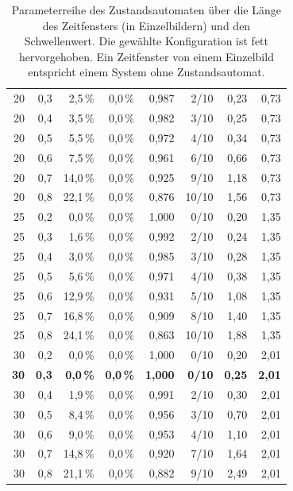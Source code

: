 \begin{table}[H]
\begin{tabular}{rrrrrrrr}
        20 & 0,3 & 2,5\,\% & 0,0\,\% & 0,987 & 2/10 & 0,23 & 0,73 \\
        20 & 0,4 & 3,5\,\% & 0,0\,\% & 0,982 & 3/10 & 0,25 & 0,73 \\
        20 & 0,5 & 5,5\,\% & 0,0\,\% & 0,972 & 4/10 & 0,34 & 0,73 \\
        20 & 0,6 & 7,5\,\% & 0,0\,\% & 0,961 & 6/10 & 0,66 & 0,73 \\
        20 & 0,7 & 14,0\,\% & 0,0\,\% & 0,925 & 9/10 & 1,18 & 0,73 \\
        20 & 0,8 & 22,1\,\% & 0,0\,\% & 0,876 & 10/10 & 1,56 & 0,73 \\
        \midrule
        25 & 0,2 & 0,0\,\% & 0,0\,\% & 1,000 & 0/10 & 0,20 & 1,35 \\
        25 & 0,3 & 1,6\,\% & 0,0\,\% & 0,992 & 2/10 & 0,24 & 1,35 \\
        25 & 0,4 & 3,0\,\% & 0,0\,\% & 0,985 & 3/10 & 0,28 & 1,35 \\
        25 & 0,5 & 5,6\,\% & 0,0\,\% & 0,971 & 4/10 & 0,38 & 1,35 \\
        25 & 0,6 & 12,9\,\% & 0,0\,\% & 0,931 & 5/10 & 1,08 & 1,35 \\
        25 & 0,7 & 16,8\,\% & 0,0\,\% & 0,909 & 8/10 & 1,40 & 1,35 \\
        25 & 0,8 & 24,1\,\% & 0,0\,\% & 0,863 & 10/10 & 1,88 & 1,35 \\
        \midrule
        30 & 0,2 & 0,0\,\% & 0,0\,\% & 1,000 & 0/10 & 0,20 & 2,01 \\
        \textbf{30} & \textbf{0,3} & \textbf{0,0\,\%} & \textbf{0,0\,\%} & \textbf{1,000} & \textbf{0/10} & \textbf{0,25} & \textbf{2,01} \\
        30 & 0,4 & 1,9\,\% & 0,0\,\% & 0,991 & 2/10 & 0,30 & 2,01 \\
        30 & 0,5 & 8,4\,\% & 0,0\,\% & 0,956 & 3/10 & 0,70 & 2,01 \\
        30 & 0,6 & 9,0\,\% & 0,0\,\% & 0,953 & 4/10 & 1,10 & 2,01 \\
        30 & 0,7 & 14,8\,\% & 0,0\,\% & 0,920 & 7/10 & 1,64 & 2,01 \\
        30 & 0,8 & 21,1\,\% & 0,0\,\% & 0,882 & 9/10 & 2,49 & 2,01 \\
        \bottomrule
    \end{tabular}
    \caption{Parameterreihe des Zustandsautomaten über die Länge des Zeitfensters (in Einzelbildern) und den Schwellenwert. Die gewählte Konfiguration ist fett hervorgehoben. Ein Zeitfenster von einem Einzelbild entspricht einem System ohne Zustandsautomat.}
    \label{tab:sm_sweep}
\end{table}

